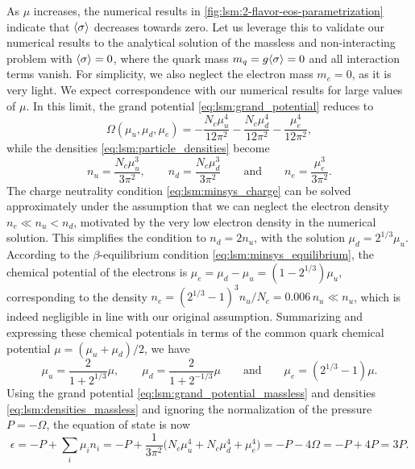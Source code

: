 As $\mu$ increases, the numerical results in \cref{fig:lsm:2-flavor-eos-parametrization} indicate that $\langle \sigma \rangle$ decreases towards zero.
Let us leverage this to validate our numerical results to the analytical solution of the massless and non-interacting problem with $\langle \sigma \rangle = 0$,
where the quark mass $m_q = g \langle \sigma \rangle = 0$ and all interaction terms vanish.
For simplicity, we also neglect the electron mass $m_e = 0$, as it is very light.
We expect correspondence with our numerical results for large values of $\mu$.
In this limit, the grand potential \eqref{eq:lsm:grand_potential} reduces to
\begin{equation}
	\Omega(\mu_u, \mu_d, \mu_e) = -\frac{N_c \mu_u^4}{12 \pi^2} - \frac{N_c \mu_d^4}{12 \pi^2} - \frac{\mu_e^4}{12 \pi^2},
\label{eq:lsm:grand_potential_massless}
\end{equation}
while the densities \eqref{eq:lsm:particle_densities} become 
\begin{equation}
	n_u = \frac{N_c \mu_u^3}{3 \pi^2}, \qquad
	n_d = \frac{N_c \mu_d^3}{3 \pi^2}  \qquad \text{and} \qquad
	n_e = \frac{\mu_e^3}{3 \pi^2}.
\label{eq:lsm:densities_massless}
\end{equation}
The charge neutrality condition \eqref{eq:lsm:minsys_charge} can be solved approximately under the assumption that we can neglect the electron density $n_e \ll n_u < n_d$,
motivated by the very low electron density in the numerical solution.
This simplifies the condition to $n_d = 2 n_u$, with the solution $\mu_d = 2^{1/3} \mu_u$.
According to the $\beta$-equilibrium condition \eqref{eq:lsm:minsys_equilibrium},
the chemical potential of the electrons is $\mu_e = \mu_d - \mu_u = (1-2^{1/3}) \mu_u$,
corresponding to the density $n_e = (2^{1/3}-1)^3 n_u / N_c = 0.006 \, n_u \ll n_u$,
which is indeed negligible in line with our original assumption.
Summarizing and expressing these chemical potentials in terms of the common quark chemical potential $\mu = (\mu_u+\mu_d)/2$, we have
\begin{equation}
	\mu_u = \frac{2}{1+2^{1/3}} \mu, \qquad
	\mu_d = \frac{2}{1+2^{-1/3}} \mu \qquad \text{and} \qquad
	\mu_e = (2^{1/3}-1) \mu.
\label{eq:lsm:chemical_potentials_massless}
\end{equation}
Using the grand potential \eqref{eq:lsm:grand_potential_massless} and densities \eqref{eq:lsm:densities_massless} and ignoring the normalization of the pressure $P = -\Omega$, the equation of state is now
\begin{equation}
	\epsilon = -P + \sum_i \mu_i n_i = -P + \frac{1}{3 \pi^2} \Big(N_c \mu_u^4 + N_c \mu_d^4 + \mu_e^4\Big) = -P - 4 \Omega = -P + 4 P = 3 P .
\end{equation}
